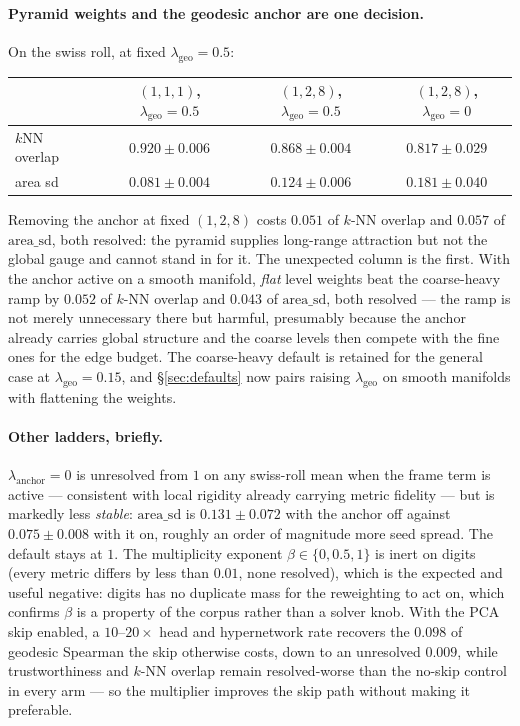 \documentclass[12pt]{iopart}
\theoremstyle{definition}
\theoremstyle{plain}
\theoremstyle{remark}
\begin{document}
\paragraph{Pyramid weights and the geodesic anchor are one decision.}
On the swiss roll, at fixed $\lambda_{\mathrm{geo}}=0.5$:

\begin{center}
\small
\begin{tabular}{lccc}
\toprule
& $(1,1,1)$, $\lambda_{\mathrm{geo}}{=}0.5$
& $(1,2,8)$, $\lambda_{\mathrm{geo}}{=}0.5$
& $(1,2,8)$, $\lambda_{\mathrm{geo}}{=}0$ \\
\midrule
$k$NN overlap & $0.920\pm0.006$ & $0.868\pm0.004$ & $0.817\pm0.029$ \\
area sd       & $0.081\pm0.004$ & $0.124\pm0.006$ & $0.181\pm0.040$ \\
\bottomrule
\end{tabular}
\end{center}

Removing the anchor at fixed $(1,2,8)$ costs $0.051$ of $k$-NN overlap and
$0.057$ of $\mathrm{area\_sd}$, both resolved: the pyramid supplies long-range
attraction but not the global gauge and cannot stand in for it. The unexpected
column is the first. With the anchor active on a smooth manifold, \emph{flat}
level weights beat the coarse-heavy ramp by $0.052$ of $k$-NN overlap and
$0.043$ of $\mathrm{area\_sd}$, both resolved --- the ramp is not merely
unnecessary there but harmful, presumably because the anchor already carries
global structure and the coarse levels then compete with the fine ones for the
edge budget. The coarse-heavy default is retained for the general case at
$\lambda_{\mathrm{geo}}=0.15$, and \S\ref{sec:defaults} now pairs raising
$\lambda_{\mathrm{geo}}$ on smooth manifolds with flattening the weights.

\paragraph{Other ladders, briefly.}
$\lambda_{\mathrm{anchor}}=0$ is unresolved from $1$ on any swiss-roll mean when
the frame term is active --- consistent with local rigidity already carrying
metric fidelity --- but is markedly less \emph{stable}: $\mathrm{area\_sd}$ is
$0.131\pm0.072$ with the anchor off against $0.075\pm0.008$ with it on, roughly
an order of magnitude more seed spread. The default stays at $1$. The
multiplicity exponent $\beta\in\{0,0.5,1\}$ is inert on digits (every metric
differs by less than $0.01$, none resolved), which is the expected and useful
negative: digits has no duplicate mass for the reweighting to act on, which
confirms $\beta$ is a property of the corpus rather than a solver knob. With the
PCA skip enabled, a $10$--$20\times$ head and hypernetwork rate recovers the
$0.098$ of geodesic Spearman the skip otherwise costs, down to an unresolved
$0.009$, while trustworthiness and $k$-NN overlap remain resolved-worse than the
no-skip control in every arm --- so the multiplier improves the skip path
without making it preferable.
\end{document}
